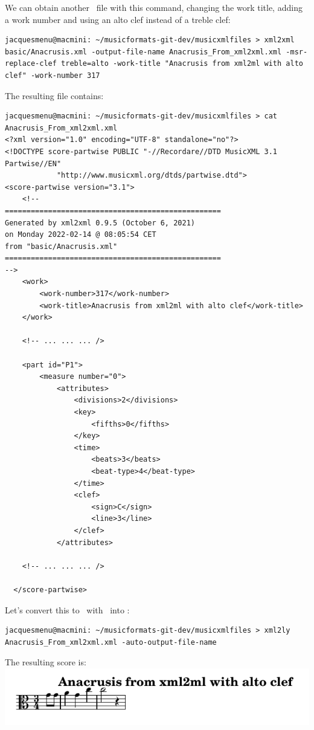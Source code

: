 We can obtain another \mxml\ file with this command, changing the work title, adding a work number and using an alto clef instead of a treble clef:
\begin{lstlisting}[language=Terminal]
jacquesmenu@macmini: ~/musicformats-git-dev/musicxmlfiles > xml2xml basic/Anacrusis.xml -output-file-name Anacrusis_From_xml2xml.xml -msr-replace-clef treble=alto -work-title "Anacrusis from xml2ml with alto clef" -work-number 317
\end{lstlisting}

The resulting file  contains:
\begin{lstlisting}[language=MusicXML]
jacquesmenu@macmini: ~/musicformats-git-dev/musicxmlfiles > cat Anacrusis_From_xml2xml.xml
<?xml version="1.0" encoding="UTF-8" standalone="no"?>
<!DOCTYPE score-partwise PUBLIC "-//Recordare//DTD MusicXML 3.1 Partwise//EN"
			"http://www.musicxml.org/dtds/partwise.dtd">
<score-partwise version="3.1">
    <!--
==================================================
Generated by xml2xml 0.9.5 (October 6, 2021)
on Monday 2022-02-14 @ 08:05:54 CET
from "basic/Anacrusis.xml"
==================================================
-->
    <work>
        <work-number>317</work-number>
        <work-title>Anacrusis from xml2ml with alto clef</work-title>
    </work>

	<!-- ... ... ... />

    <part id="P1">
        <measure number="0">
            <attributes>
                <divisions>2</divisions>
                <key>
                    <fifths>0</fifths>
                </key>
                <time>
                    <beats>3</beats>
                    <beat-type>4</beat-type>
                </time>
                <clef>
                    <sign>C</sign>
                    <line>3</line>
                </clef>
            </attributes>

	<!-- ... ... ... />

  </score-partwise>
\end{lstlisting}

Let's convert this to \lily\ with \xmlToLy\ into :
\begin{lstlisting}[language=Terminal]
jacquesmenu@macmini: ~/musicformats-git-dev/musicxmlfiles > xml2ly Anacrusis_From_xml2xml.xml -auto-output-file-name
\end{lstlisting}

The resulting score is:\\
\includegraphics[scale=0.7]{../mfgraphics/mfgraphicsAnacrusis_From_xml2xml.png}

